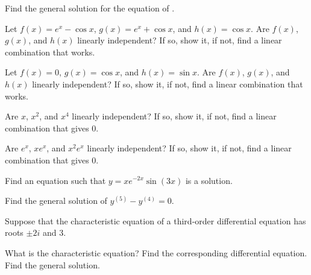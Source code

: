 \begin{exercise}
Find the general solution for the equation of .
\end{exercise}

\begin{exercise}
Let
$f(x) = e^x - \cos x$, $g(x) = e^x + \cos x$, and $h(x) = \cos x$.
Are $f(x)$, $g(x)$, and $h(x)$
linearly independent?  If so, show
it, if not, find a linear combination that works.
\end{exercise}

\begin{exercise}
Let
$f(x) = 0$, $g(x) = \cos x$, and $h(x) = \sin x$.
Are $f(x)$, $g(x)$, and $h(x)$
linearly independent?  If so, show
it, if not, find a linear combination that works.
\end{exercise}

\begin{exercise}
Are $x$, $x^2$, and $x^4$
linearly independent?  If so, show
it, if not, find a linear combination that gives $0$.
\end{exercise}

\begin{exercise}
Are $e^x$, $xe^x$, and $x^2e^x$
linearly independent?  If so, show
it, if not, find a linear combination that gives $0$.
\end{exercise}

\begin{exercise}
Find an equation such that $y=xe^{-2x}\sin(3x)$ is a solution.
\end{exercise}

\setcounter{exercise}{100}

\begin{exercise}
Find the general solution of $y^{(5)}-y^{(4)}=0$.
\end{exercise}

\begin{exercise}
\pagebreak[2]
Suppose that the characteristic equation of a third-order differential
equation has
roots $\pm 2i$ and 3.
\begin{tasks}
\task
What is the characteristic equation?
\task
Find the
corresponding differential equation.
\task
Find the general solution.
\end{tasks}
\end{exercise}

